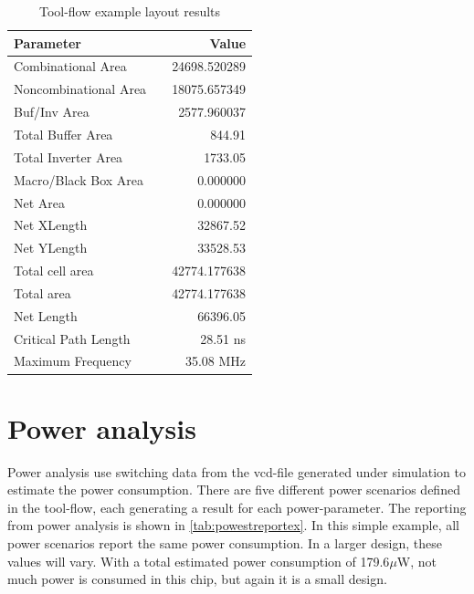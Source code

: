 \begin{table}[hbpt]
    \centering
    \begin{tabular}{lcr}
        \textbf{Parameter} && \textbf{Value} \\
        \toprule
        Combinational Area && 24698.520289 \\
        Noncombinational Area && 18075.657349 \\
        Buf/Inv Area && 2577.960037 \\
        Total Buffer Area && 844.91 \\
        Total Inverter Area && 1733.05 \\
        Macro/Black Box Area && 0.000000 \\
        Net Area && 0.000000 \\
        Net XLength && 32867.52 \\
        Net YLength && 33528.53 \\
        \midrule
        Total cell area && 42774.177638 \\
        Total area && 42774.177638 \\
        Net Length && 66396.05 \\
        \midrule
        Critical Path Length && 28.51 ns \\
        Maximum Frequency && 35.08 MHz\\
        \bottomrule
    \end{tabular}
    \caption{Tool-flow example layout results}
    \label{tab:layoutreportex}
\end{table}

\section{Power analysis}
Power analysis use switching data from the \gls{vcd}-file generated under simulation to estimate the power consumption. There are five different power scenarios defined in the tool-flow, each generating a result for each power-parameter. The reporting from power analysis is shown in \cref{tab:powestreportex}. In this simple example, all power scenarios report the same power consumption. In a larger design, these values will vary. With a total estimated power consumption of 179.6$\mu$W, not much power is consumed in this chip, but again it is a small design.

